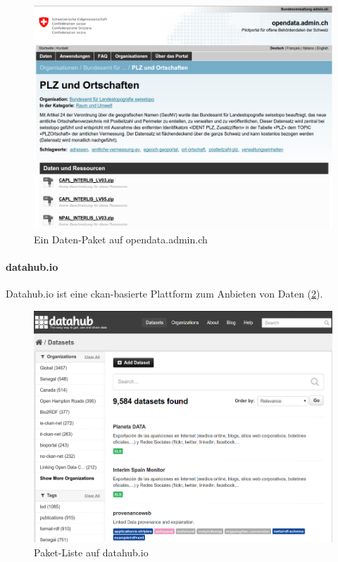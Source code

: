 \begin{figure}[H]
    \centering
    \includegraphics[width=2\linewidth/3]{fig/opendata-admin-ch}
    \caption{Ein Daten-Paket auf opendata.admin.ch}
    \label{fig:tb:opendata-admin-ch}
\end{figure}

\paragraph{datahub.io}
Datahub.io ist eine \gls{ckan}-basierte Plattform zum Anbieten von Daten (\cref{fig:tb:datahub-io}).

\begin{figure}[H]
    \centering
    \includegraphics[width=2\linewidth/3]{fig/datahub-io}
    \caption{Paket-Liste auf datahub.io}
    \label{fig:tb:datahub-io}
\end{figure}

